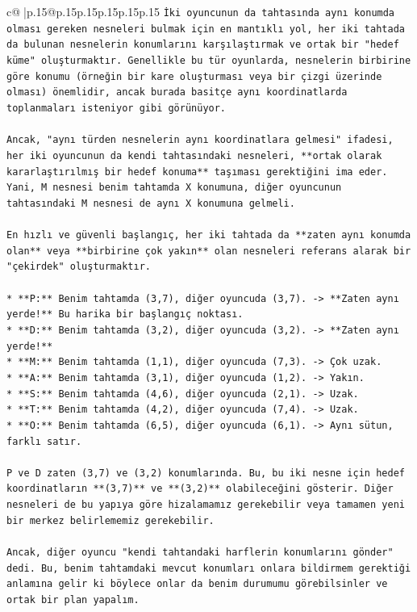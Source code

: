 \documentclass{article}
\begin{document}
{\begin{supertabular}{c@{$\;$}|p{.15\linewidth}@{}p{.15\linewidth}p{.15\linewidth}p{.15\linewidth}p{.15\linewidth}p{.15\linewidth}}
{{{\texttt{İki oyuncunun da tahtasında aynı konumda olması gereken nesneleri bulmak için en mantıklı yol, her iki tahtada da bulunan nesnelerin konumlarını karşılaştırmak ve ortak bir "hedef küme" oluşturmaktır. Genellikle bu tür oyunlarda, nesnelerin birbirine göre konumu (örneğin bir kare oluşturması veya bir çizgi üzerinde olması) önemlidir, ancak burada basitçe aynı koordinatlarda toplanmaları isteniyor gibi görünüyor.} \\
\\ 
\texttt{Ancak, "aynı türden nesnelerin aynı koordinatlara gelmesi" ifadesi, her iki oyuncunun da kendi tahtasındaki nesneleri, **ortak olarak kararlaştırılmış bir hedef konuma** taşıması gerektiğini ima eder. Yani, M nesnesi benim tahtamda X konumuna, diğer oyuncunun tahtasındaki M nesnesi de aynı X konumuna gelmeli.} \\
\\ 
\texttt{En hızlı ve güvenli başlangıç, her iki tahtada da **zaten aynı konumda olan** veya **birbirine çok yakın** olan nesneleri referans alarak bir "çekirdek" oluşturmaktır.} \\
\\ 
\texttt{*   **P:** Benim tahtamda (3,7), diğer oyuncuda (3,7). {-}> **Zaten aynı yerde!** Bu harika bir başlangıç noktası.} \\
\texttt{*   **D:** Benim tahtamda (3,2), diğer oyuncuda (3,2). {-}> **Zaten aynı yerde!**} \\
\texttt{*   **M:** Benim tahtamda (1,1), diğer oyuncuda (7,3). {-}> Çok uzak.} \\
\texttt{*   **A:** Benim tahtamda (3,1), diğer oyuncuda (1,2). {-}> Yakın.} \\
\texttt{*   **S:** Benim tahtamda (4,6), diğer oyuncuda (2,1). {-}> Uzak.} \\
\texttt{*   **T:** Benim tahtamda (4,2), diğer oyuncuda (7,4). {-}> Uzak.} \\
\texttt{*   **O:** Benim tahtamda (6,5), diğer oyuncuda (6,1). {-}> Aynı sütun, farklı satır.} \\
\\ 
\texttt{P ve D zaten (3,7) ve (3,2) konumlarında. Bu, bu iki nesne için hedef koordinatların **(3,7)** ve **(3,2)** olabileceğini gösterir. Diğer nesneleri de bu yapıya göre hizalamamız gerekebilir veya tamamen yeni bir merkez belirlememiz gerekebilir.} \\
\\ 
\texttt{Ancak, diğer oyuncu "kendi tahtandaki harflerin konumlarını gönder" dedi. Bu, benim tahtamdaki mevcut konumları onlara bildirmem gerektiği anlamına gelir ki böylece onlar da benim durumumu görebilsinler ve ortak bir plan yapalım.} \\
}}}
\end{supertabular}}
\end{document}
